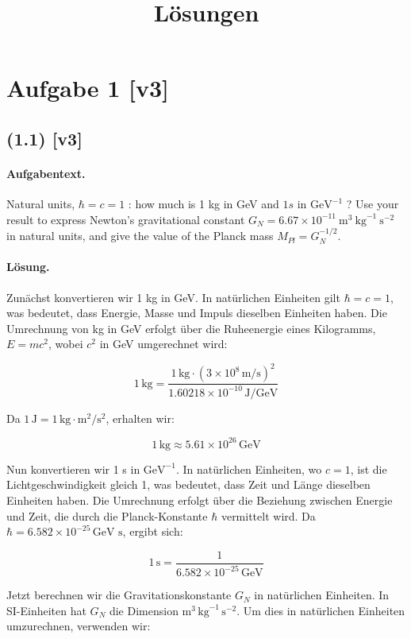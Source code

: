 \documentclass[11pt,a4paper]{article}
\title{Lösungen}
\date{}
\begin{document}
\maketitle

\section*{Aufgabe 1 [v3]}
\subsection*{(1.1) [v3]}
\paragraph{Aufgabentext.}
Natural units, $\hbar=c=1$ : how much is 1 kg in GeV and $1 s$ in $\mathrm{GeV}^{-1}$ ? Use your result to express Newton's gravitational constant $G_N=6.67 \times 10^{-11} \mathrm{~m}^3 \mathrm{~kg}^{-1} \mathrm{~s}^{-2}$ in natural units, and give the value of the Planck mass $M_{P l}=G_N^{-1 / 2}$.

\paragraph{Lösung.}
Zunächst konvertieren wir 1 kg in GeV. In natürlichen Einheiten gilt $\hbar = c = 1$, was bedeutet, dass Energie, Masse und Impuls dieselben Einheiten haben. Die Umrechnung von kg in GeV erfolgt über die Ruheenergie eines Kilogramms, $E = mc^2$, wobei $c^2$ in GeV umgerechnet wird:

\[
1 \, \text{kg} = \frac{1 \, \text{kg} \cdot (3 \times 10^8 \, \text{m/s})^2}{1.60218 \times 10^{-10} \, \text{J/GeV}}
\]

Da $1 \, \text{J} = 1 \, \text{kg} \cdot \text{m}^2/\text{s}^2$, erhalten wir:

\[
1 \, \text{kg} \approx 5.61 \times 10^{26} \, \text{GeV}
\]

Nun konvertieren wir 1 s in $\mathrm{GeV}^{-1}$. In natürlichen Einheiten, wo $c = 1$, ist die Lichtgeschwindigkeit gleich 1, was bedeutet, dass Zeit und Länge dieselben Einheiten haben. Die Umrechnung erfolgt über die Beziehung zwischen Energie und Zeit, die durch die Planck-Konstante $\hbar$ vermittelt wird. Da $\hbar = 6.582 \times 10^{-25} \, \text{GeV s}$, ergibt sich:

\[
1 \, \text{s} = \frac{1}{6.582 \times 10^{-25} \, \text{GeV}}
\]

Jetzt berechnen wir die Gravitationskonstante $G_N$ in natürlichen Einheiten. In SI-Einheiten hat $G_N$ die Dimension $\mathrm{m}^3 \, \mathrm{kg}^{-1} \, \mathrm{s}^{-2}$. Um dies in natürlichen Einheiten umzurechnen, verwenden wir:
\end{document}
